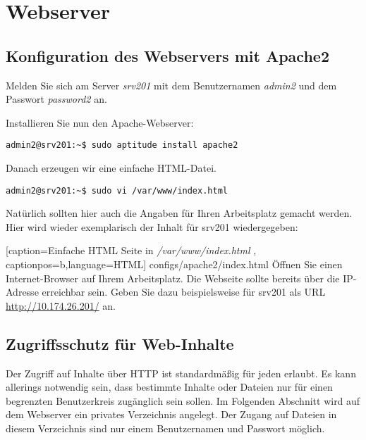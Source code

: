 \section{Webserver}

\subsection{Konfiguration des Webservers mit Apache2}
Melden Sie sich am Server \textit{srv201} mit dem Benutzernamen \textit{admin2}
und dem Passwort \textit{password2} an.

Installieren Sie nun den Apache-Webserver:
\begin{lstlisting}
admin2@srv201:~$ sudo aptitude install apache2
\end{lstlisting}
Danach erzeugen wir eine einfache HTML-Datei.
\begin{lstlisting}
admin2@srv201:~$ sudo vi /var/www/index.html
\end{lstlisting}
Natürlich sollten hier auch die Angaben für Ihren Arbeitsplatz gemacht werden. Hier wird wieder exemplarisch 
der Inhalt für srv201 wiedergegeben:

    [caption={Einfache HTML Seite in \textit{/var/www/index.html}}
       \label{lst:index.html},
       captionpos=b,language=HTML]
{configs/apache2/index.html}
Öffnen Sie einen Internet-Browser auf Ihrem Arbeitsplatz. Die Webseite sollte bereits über die IP-Adresse erreichbar sein. Geben Sie dazu
beispielsweise für srv201 als URL\\
\url{http://10.174.26.201/} an.

\subsection{Zugriffsschutz für Web-Inhalte}
Der Zugriff auf Inhalte über HTTP ist standardmäßig für jeden erlaubt. Es kann
allerings notwendig sein, dass bestimmte Inhalte oder Dateien nur für einen
begrenzten Benutzerkreis zugänglich sein sollen. Im Folgenden Abschnitt wird auf
dem Webserver ein privates Verzeichnis angelegt. Der Zugang auf Dateien in
diesem Verzeichnis sind nur einem Benutzernamen und Passwort möglich.

